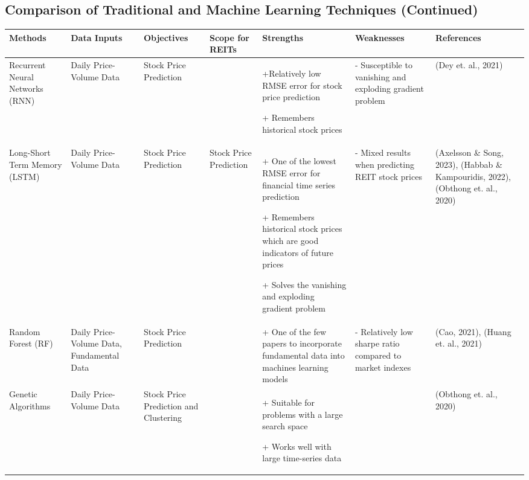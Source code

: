 \documentclass[a4paper,12pt]{report}
\numberwithin{equation}{section}
\theoremstyle{definition}
\begin{document}
\begin{landscape}
  \section{Comparison of Traditional and Machine Learning Techniques (Continued)}
  \begin{table}[H]
    \begin{adjustwidth}{-1.25cm}{-1.25cm}
    \begin{tabular}{|p{2.6cm}|p{2.7cm}|p{2.7cm}|p{3.5cm}|p{5cm}|p{5cm}|p{4cm}|}
    \hline
    \textbf{Methods} & \textbf{Data Inputs} & \textbf{Objectives} & \textbf{Scope for REITs} & \textbf{Strengths} & \textbf{Weaknesses} & \textbf{References}  
    \\ \hline Recurrent Neural Networks (RNN) & Daily Price-Volume Data & Stock Price Prediction & & +Relatively low RMSE error for stock price prediction\par + Remembers historical stock prices & - Susceptible to vanishing and exploding gradient problem & (Dey et. al., 2021) 
    \\ \hline Long-Short Term Memory (LSTM) & Daily Price-Volume Data & Stock Price Prediction & Stock Price Prediction & + One of the lowest RMSE error for financial time series prediction \par+ Remembers historical stock prices which are good indicators of future prices \par+ Solves the vanishing and exploding gradient problem & - Mixed results when predicting REIT stock prices & (Axelsson \& Song, 2023),   (Habbab \& Kampouridis, 2022), (Obthong et. al., 2020) 
    \\ \hline Random Forest (RF) & Daily Price-Volume Data, Fundamental Data & Stock Price Prediction & & + One of the few papers to incorporate fundamental data into machines learning models & - Relatively low sharpe ratio compared to market indexes & (Cao, 2021), (Huang et. al., 2021)  
    \\ \hline Genetic Algorithms & Daily Price-Volume Data & Stock Price Prediction and Clustering & & + Suitable for problems with a large search space \par+ Works well with large time-series data & & (Obthong et. al., 2020) 
    \\ \hline
    \end{tabular}
  \end{adjustwidth}
  \end{table}



  
\end{landscape}
\end{document}

